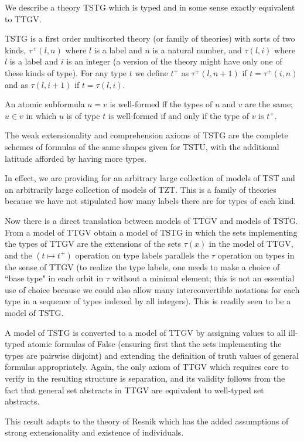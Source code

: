 \documentclass[12pt]{article}
\begin{document}
We describe a theory TSTG which is typed and in some sense exactly equivalent to TTGV.

TSTG is a first order multisorted theory (or family of theories) with sorts of two kinds, $\tau^+(l,n)$ where $l$ is a label and $n$ is a natural number, and $\tau(l,i)$ where $l$ is a label and $i$ is an integer (a version of the theory might have only one of these kinds of type).  For any type $t$ we define $t^+$ as $\tau^+(l,n+1)$ if $t=\tau^+(i,n)$ and as $\tau(l,i+1)$ if $t=\tau(l,i)$.  

An atomic subformula $u=v$ is well-formed ff the types of $u$ and $v$ are the same; $u \in v$ in which $u$ is of type $t$ is well-formed if and only if the type of $v$ is $t^+$.

The weak extensionality and comprehension axioms of TSTG are the complete schemes of formulas of the same shapes given for TSTU, with the additional latitude afforded by having more types.

In effect, we are providing for an arbitrary large collection of models of TST and an arbitrarily large collection of models of TZT.  This is a family of theories because we have not stipulated how many labels there are for types of each kind.

Now there is a direct translation between models of TTGV and models of TSTG.  From a model of TTGV obtain a model of TSTG in which the sets implementing the types of TTGV are the extensions of the sets $\tau(x)$ in the model of TTGV, and the $(t \mapsto t^+)$ operation on type labels parallels the $\tau$ operation on types in the sense of TTGV (to realize the type labels, one needs to make a choice of ``base type" in each orbit in $\tau$ without a minimal element;  this is not an essential use of choice because we could also allow many interconvertible notations for each type in a sequence of types indexed by all integers).  This is readily seen to be a model of TSTG.

A model of TSTG is converted to a model of TTGV by assigning values to all ill-typed atomic formulas of False
(ensuring first that the sets implementing the types are pairwise disjoint) and extending the definition of truth values of general formulas appropriately.  Again, the only axiom of TTGV which requires care to verify in the resulting structure is separation, and its validity follows from the fact
that general set abstracts in TTGV are equivalent to well-typed set abstracts.

This result adapts to the theory of Resnik which has the added assumptions of strong extensionality and existence of individuals.
\end{document}

